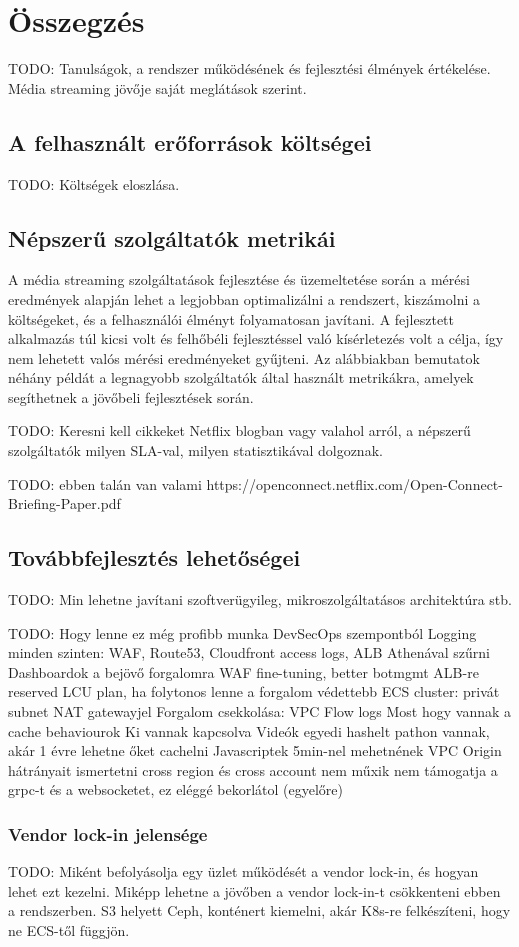 \chapter{Összegzés}

TODO: Tanulságok, a rendszer működésének és fejlesztési élmények értékelése. Média streaming jövője saját meglátások szerint.

\section{A felhasznált erőforrások költségei}

TODO: Költségek eloszlása.

\section{Népszerű szolgáltatók metrikái}

A média streaming szolgáltatások fejlesztése és üzemeltetése során a mérési eredmények alapján lehet a legjobban optimalizálni a rendszert, kiszámolni a költségeket, és a felhasználói élményt folyamatosan javítani. A fejlesztett alkalmazás túl kicsi volt és felhőbéli fejlesztéssel való kísérletezés volt a célja, így nem lehetett valós mérési eredményeket gyűjteni. Az alábbiakban bemutatok néhány példát a legnagyobb szolgáltatók által használt metrikákra, amelyek segíthetnek a jövőbeli fejlesztések során.

TODO: Keresni kell cikkeket Netflix blogban vagy valahol arról, a népszerű szolgáltatók milyen SLA-val, milyen statisztikával dolgoznak.

TODO: ebben talán van valami https://openconnect.netflix.com/Open-Connect-Briefing-Paper.pdf 


\section{Továbbfejlesztés lehetőségei}

TODO: Min lehetne javítani szoftverügyileg, mikroszolgáltatásos architektúra stb.

TODO: Hogy lenne ez még profibb munka DevSecOps szempontból
Logging minden szinten: WAF, Route53, Cloudfront access logs, ALB
Athenával szűrni
Dashboardok a bejövő forgalomra
WAF fine-tuning, better botmgmt
ALB-re reserved LCU plan, ha folytonos lenne a forgalom
védettebb ECS cluster: privát subnet
NAT gatewayjel
Forgalom csekkolása: VPC Flow logs
Most hogy vannak a cache behaviourok
Ki vannak kapcsolva
Videók egyedi hashelt pathon vannak, akár 1 évre lehetne őket cachelni
Javascriptek 5min-nel mehetnének
VPC Origin hátrányait ismertetni
cross region és cross account nem műxik
nem támogatja a grpc-t és a websocketet, ez eléggé bekorlátol (egyelőre)

\subsection{Vendor lock-in jelensége}

TODO: Miként befolyásolja egy üzlet működését a vendor lock-in, és hogyan lehet ezt kezelni. Miképp lehetne a jövőben a vendor lock-in-t csökkenteni ebben a rendszerben. S3 helyett Ceph, konténert kiemelni, akár K8s-re felkészíteni, hogy ne ECS-től függjön.
